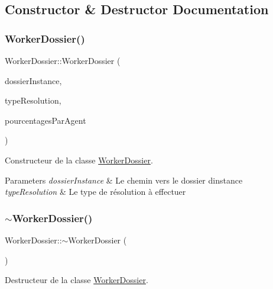 \subsection{Constructor \& Destructor Documentation}
\mbox{\label{classWorkerDossier_a72e98152d70e4c7bdbc0d0c138ba992a}} 
\subsubsection{\texorpdfstring{Worker\+Dossier()}{WorkerDossier()}}
{\footnotesize\ttfamily Worker\+Dossier\+::\+Worker\+Dossier (\begin{DoxyParamCaption}\item[{Q\+String}]{dossier\+Instance,  }\item[{Q\+String}]{type\+Resolution,  }\item[{map$<$ unsigned int, unsigned int $>$}]{pourcentages\+Par\+Agent }\end{DoxyParamCaption})}



Constructeur de la classe \hyperlink{classWorkerDossier}{Worker\+Dossier}. 


\begin{DoxyParams}{Parameters}
{\em dossier\+Instance} & Le chemin vers le dossier d\textquotesingle{}instance \\
\hline
{\em type\+Resolution} & Le type de résolution à effectuer \\
\hline
\end{DoxyParams}
\mbox{\label{classWorkerDossier_ac2d339dcdd7e35d1fed6debf3495f904}} 
\subsubsection{\texorpdfstring{$\sim$\+Worker\+Dossier()}{~WorkerDossier()}}
{\footnotesize\ttfamily Worker\+Dossier\+::$\sim$\+Worker\+Dossier (\begin{DoxyParamCaption}{ }\end{DoxyParamCaption})}



Destructeur de la classe \hyperlink{classWorkerDossier}{Worker\+Dossier}. 



